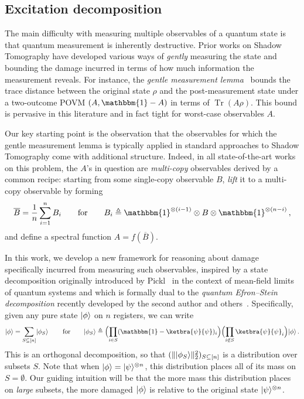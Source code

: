 \documentclass[10pt]{article}
\DeclarePairedDelimiter{\ket}{\lvert}{\rangle}%
\DeclarePairedDelimiter\norm{\lVert}{\rVert}
\DeclareMathOperator{\Tr}{Tr}
\newcommand{\Id}{\mathbbm{1}}
\begin{document}
\subsection{Excitation decomposition} 

The main difficulty with measuring multiple observables of a quantum state is that quantum measurement is inherently destructive. Prior works on Shadow Tomography have developed various ways of \emph{gently} measuring the state and bounding the damage incurred in terms of how much information the measurement reveals. For instance, the \emph{gentle measurement lemma}~\cite{winter1999coding,ogawa2002new} bounds the trace distance between the original state $\rho$ and the post-measurement state under a two-outcome POVM $(A,\Id-A)$ in terms of $\Tr(A\rho)$. This bound is pervasive in this literature and in fact tight for worst-case observables $A$.

Our key starting point is the observation that the observables for which the gentle measurement lemma is typically applied in standard approaches to Shadow Tomography come with additional structure. Indeed, in all state-of-the-art works on this problem, the $A$'s in question are \emph{multi-copy} observables derived by a common recipe: starting from some single-copy observable $B$, \emph{lift} it to a multi-copy observable by forming
\begin{equation}
    \overline{B} = \frac{1}{n}\sum^n_{i=1} B_i \qquad \text{for} \qquad B_i \triangleq \Id^{\otimes (i-1)} \otimes B\otimes \Id^{\otimes (n-i)}\,, \label{eq:lift_overview}
\end{equation}
and define a spectral function $A = f(\overline{B})$.

In this work, we develop a new framework for reasoning about damage specifically incurred from measuring such observables, inspired by a state decomposition originally introduced by Pickl~\cite{pickl2011simple} in the context of mean-field limits of quantum systems and which is formally dual to the \emph{quantum Efron--Stein decomposition} recently developed by the second author and others~\cite{de2025non}. Specifically, given any pure state $\ket{\phi}$ on $n$ registers, we can write
\begin{equation}
    \ket{\phi} = \sum_{S\subseteq[n]} \ket{\phi_S}\, \qquad \text{for} \qquad \ket{\phi_S} \triangleq \Bigl(\prod_{i\in S} (\Id - \ketbra{\psi}{\psi})_i\Bigr) \Bigl(\prod_{i\not\in S} \ketbra{\psi}{\psi}_i \Bigr)\ket{\phi}\,.
\end{equation}
This is an orthogonal decomposition, so that $(\norm{\ket{\phi_S}}^2_2)_{S\subseteq[n]}$ is a distribution over subsets $S$. Note that when $\ket{\phi} = \ket{\psi}^{\otimes n}$, this distribution places all of its mass on $S = \emptyset$. Our guiding intuition will be that the more mass this distribution places on \emph{large} subsets, the more damaged $\ket{\phi}$ is relative to the original state $\ket{\psi}^{\otimes n}$. 
\end{document}
